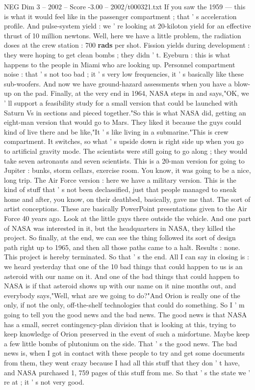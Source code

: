 \begin{textsample}{NEG Dim 3 – 2002 – Score -3.00 – 2002/t000321.txt}
If you saw the 1959 — this is what it would feel like in the passenger compartment ; that ' s acceleration profile.
And pulse-system yield : we ' re looking at 20-kiloton yield for an effective thrust of 10 million newtons.
Well, here we have a little problem, the radiation doses at the crew station : 700 \textbf{rads} per shot.
Fission yields during development : they were hoping to get clean bombs ; they didn ' t.
Eyeburn : this is what happens to the people in Miami who are looking up.
Personnel compartment noise : that ' s not too bad ; it ' s very low frequencies, it ' s basically like these sub-woofers.
And now we have ground-hazard assessments when you have a blow-up on the pad.
Finally, at the very end in 1964, NASA steps in and says,"OK, we ' ll support a feasibility study for a small version that could be launched with Saturn Vs in sections and pieced together."So this is what NASA did, getting an eight-man version that would go to Mars.
They liked it because the guys could kind of live there and be like,"It ' s like living in a submarine."This is crew compartment.
It switches, so what ' s upside down is right side up when you go to artificial gravity mode.
The scientists were still going to go along ; they would take seven astronauts and seven scientists.
This is a 20-man version for going to Jupiter : bunks, storm cellars, exercise room.
You know, it was going to be a nice, long trip.
The Air Force version : here we have a military version.
This is the kind of stuff that ' s not been declassified, just that people managed to sneak home and after, you know, on their deathbed, basically, gave me that.
The sort of artist conceptions.
These are basically PowerPoint presentations given to the Air Force 40 years ago.
Look at the little guys there outside the vehicle.
And one part of NASA was interested in it, but the headquarters in NASA, they killed the project.
So finally, at the end, we can see the thing followed its sort of design path right up to 1965, and then all those paths came to a halt.
Results : none.
This project is hereby terminated.
So that ' s the end.
All I can say in closing is : we heard yesterday that one of the 10 bad things that could happen to us is an asteroid with our name on it.
And one of the bad things that could happen to NASA is if that asteroid shows up with our name on it nine months out, and everybody says,"Well, what are we going to do?"And Orion is really one of the only, if not the only, off-the-shelf technologies that could do something.
So I ' m going to tell you the good news and the bad news.
The good news is that NASA has a small, secret contingency-plan division that is looking at this, trying to keep knowledge of Orion preserved in the event of such a misfortune.
Maybe keep a few little bombs of plutonium on the side.
That ' s the good news.
The bad news is, when I got in contact with these people to try and get some documents from them, they went crazy because I had all this stuff that they don ' t have, and NASA purchased 1, 759 pages of this stuff from me.
So that ' s the state we ' re at ; it ' s not very good.

\end{textsample}
